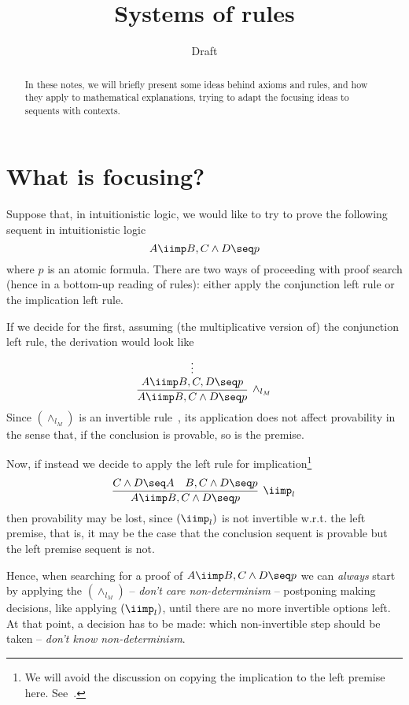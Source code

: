 \documentclass{llncs}
\title{Systems of rules}
\author{Draft}
\institute{\today}
\begin{document}
\maketitle

\begin{abstract}
In these notes, we will briefly present some ideas behind axioms and rules, and how they apply to mathematical explanations, trying to adapt the focusing ideas to sequents with contexts.
\end{abstract}

\section{What is focusing?}
Suppose that, in intuitionistic logic, we would like to try to prove the following sequent in intuitionistic logic
\[
A\iimp B, C\wedge D\seq p
\]
where $p$ is an atomic formula. There are two ways of proceeding with proof search (hence in a bottom-up reading of rules): either apply the conjunction left rule or the implication left rule.

If we decide for the first, assuming (the multiplicative version of) the conjunction left rule, the derivation would look like
\[
\infer[\wedge_{l_M}]{A\iimp B, C\wedge D\seq p}
{\deduce{A\iimp B, C, D\seq p}{
\deduce{}{\vdots}}}
\] 
Since $(\wedge_{l_M})$ is an invertible rule~\cite{troelstra00book}, its application does not affect provability in the sense that, if the conclusion is provable, so is the premise.

Now, if instead we decide to apply the left rule for implication\footnote{We will avoid the discussion on copying the  implication to the left premise here. See~\cite{DBLP:journals/jsyml/Dyckhoff92}.}
\[
\infer[\iimp_{l}]{A\iimp B, C\wedge D\seq p}{C\wedge D\seq A & B, C\wedge D\seq p}
\] 
then provability may be lost, since $(\iimp_{l})$ is not invertible w.r.t. the left premise, that is, it may be the case that the conclusion sequent is provable but the left premise sequent is not.

Hence, when  searching for a proof of $A\iimp B, C\wedge D\seq p$ we can {\em always} start by applying the $(\wedge_{l_M})$ --  {\em don't care non-determinism} -- postponing making decisions, like applying $(\iimp_{l})$, until there are no more invertible options left. At that point, a decision has to be made: which non-invertible step should be taken --  {\em don't know non-determinism}. 
\end{document}
